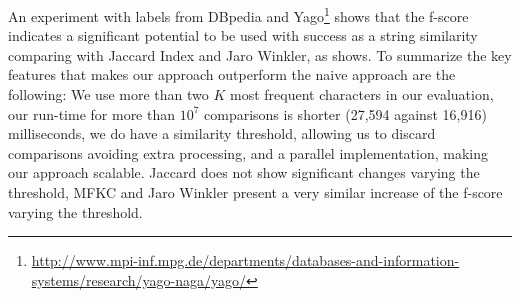 An experiment with labels from DBpedia and Yago\footnote{\url{http://www.mpi-inf.mpg.de/departments/databases-and-information-systems/research/yago-naga/yago/}} shows that the f-score indicates a significant potential to be used with success as a string similarity comparing with Jaccard Index and Jaro Winkler, as  shows.
To summarize the key features that makes our approach outperform the naive approach are the following: We use more than two $K$ most frequent characters in our evaluation, our run-time for more than $10^7$ comparisons is shorter (27,594 against 16,916) milliseconds, we do have a similarity threshold, allowing us to discard comparisons avoiding extra processing, and a parallel implementation, making our approach scalable.
Jaccard does not show significant changes varying the threshold, MFKC and Jaro Winkler present a very similar increase of the f-score varying the threshold.



